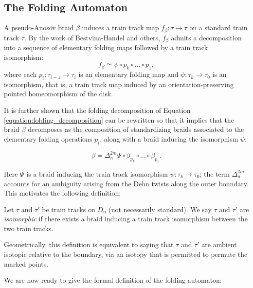 \subsection{The Folding Automaton}
A pseudo-Anosov braid $\beta$ induces a train track map $f_\beta: \tau \to \tau$ on a standard train track $\tau$. By the work of Bestvina-Handel and others, $f_\beta$ admits a decomposition into a sequence of elementary folding maps followed by a train track isomorphism:
\begin{equation}\label{equation:folding_decomposition}
        f_\beta \simeq \psi \circ p_k \circ \dots \circ p_1,
\end{equation}
where each $p_i: \tau_{i-1} \to \tau_i$ is an elementary folding map and $\psi: \tau_k \to \tau_0$ is an isomorphism, that is, a train track map induced by an orientation-preserving pointed homeomorphism of the disk.

It is further shown that the folding decomposition of Equation \eqref{equation:folding_decomposition} can be rewritten so that it implies that the braid $\beta$ decomposes as the composition of standardizing braids associated to the elementary folding operations $p_i$, along with a braid inducing the isomorphism $\psi$:

\begin{equation}\label{equation:folding_decomposition_braid}
    \beta = \Delta_n^{2m} \Psi \circ \beta_{p_k} \circ \dots \circ \beta_{p_1}.
\end{equation}

Here $\Psi$ is a braid inducing the train track isomorphism $\psi \colon \tau_k \to \tau_0$; the term $\Delta_n^{2m}$ accounts for an ambiguity arising from the Dehn twists along the outer boundary. This motivates the following definition:

\begin{definition}
    Let $\tau$ and $\tau'$ be train tracks on $D_n$ (not necessarily standard). We say $\tau$ and $\tau'$ are \emph{isomorphic} if there exists a braid inducing a train track isomorphism between the two train tracks.
\end{definition}

Geometrically, this definition is equivalent to saying that $\tau$ and $\tau'$ are ambient isotopic relative to the boundary, via an isotopy that is permitted to permute the marked points.

We are now ready to give the formal definition of the folding automaton:


